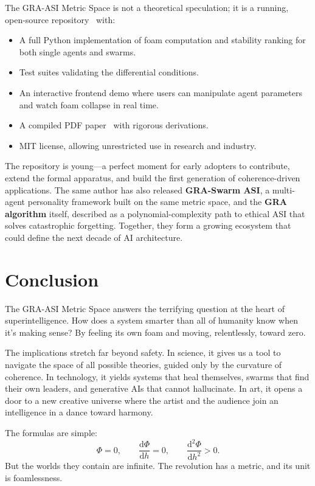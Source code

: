 \documentclass[11pt,a4paper]{article}
\begin{document}
The GRA-ASI Metric Space is not a theoretical speculation; it is a running, open-source repository~\cite{gra_github} with:
\begin{itemize}
    \item A full Python implementation of foam computation and stability ranking for both single agents and swarms.
    \item Test suites validating the differential conditions.
    \item An interactive frontend demo where users can manipulate agent parameters and watch foam collapse in real time.
    \item A compiled PDF paper~\cite{gra_doi} with rigorous derivations.
    \item MIT license, allowing unrestricted use in research and industry.
\end{itemize}

The repository is young---a perfect moment for early adopters to contribute, extend the formal apparatus, and build the first generation of coherence-driven applications. The same author has also released \textbf{GRA-Swarm ASI}, a multi-agent personality framework built on the same metric space, and the \textbf{GRA algorithm} itself, described as a polynomial-complexity path to ethical ASI that solves catastrophic forgetting. Together, they form a growing ecosystem that could define the next decade of AI architecture.

\section{Conclusion}

The GRA-ASI Metric Space answers the terrifying question at the heart of superintelligence. How does a system smarter than all of humanity know when it's making sense? By feeling its own foam and moving, relentlessly, toward zero.

The implications stretch far beyond safety. In science, it gives us a tool to navigate the space of all possible theories, guided only by the curvature of coherence. In technology, it yields systems that heal themselves, swarms that find their own leaders, and generative AIs that cannot hallucinate. In art, it opens a door to a new creative universe where the artist and the audience join an intelligence in a dance toward harmony.

The formulas are simple:
\begin{equation*}
    \Phi = 0, \qquad \frac{\mathrm{d}\Phi}{\mathrm{d}h} = 0, \qquad \frac{\mathrm{d}^2\Phi}{\mathrm{d}h^2} > 0.
\end{equation*}
But the worlds they contain are infinite. The revolution has a metric, and its unit is foamlessness.
\end{document}
